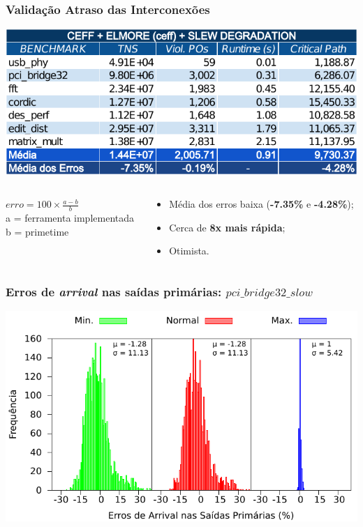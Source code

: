 \documentclass[10pt,a4paper]{beamer}
\begin{document}
		
		\begin{frame}[t]
			\frametitle{Validação Atraso das Interconexões}
			\begin{center}
				\includegraphics[width=\linewidth]{img/ceff_elmore_slew.pdf}
			\end{center}
			\begin{columns}
				\begin{column}{0.4\textwidth}
					\begin{shaded}
						$erro = 100 \times \frac{a - b}{ b } $ \\
						\small{a = ferramenta implementada} \\
						\small{b = primetime}
					\end{shaded}
				\end{column}
				\begin{column}{0.6\textwidth}
					\begin{itemize}
						\item Média dos erros baixa (\textbf{-7.35\%} e \textbf{-4.28\%});
						\item Cerca de \textbf{8x mais rápida};
						\item Otimista.
					\end{itemize}
				\end{column}
			\end{columns}			
			
		\end{frame}
		
		\begin{frame}[t]
			\frametitle{Erros de \textit{arrival} nas saídas primárias: $pci\_bridge32\_slow$}
			\begin{center}
				\includegraphics[width=0.9\linewidth]{img/arrival_error/pci_bridge32_puri.pdf}\\
			\end{center}
		\end{frame}		
		
\end{document}
